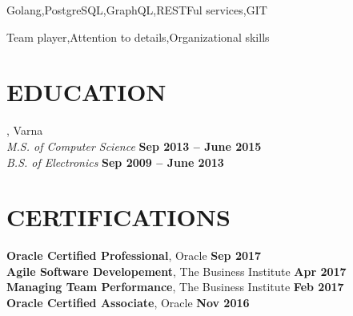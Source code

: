 \documentclass[margin,line]{resume}
\begin{document}
\begin{resume}
    \begin{list2}
      \item Golang,\hspace{2mm}PostgreSQL,\hspace{2mm}GraphQL,\hspace{2mm}RESTFul services,\hspace{2mm}GIT\@
      \item Team player,\hspace{2mm}Attention to details,\hspace{2mm}Organizational skills\@
    \end{list2}

\sectionline%

    \section{\mysidestyle\textbf{\large{E}\small{DUCATION}}}

    \textbf{}, Varna \vspace{2mm}\\\vspace{1mm}%
    \textsl{M.S. of Computer Science} \hfill \textbf{ Sep 2013 {--} June 2015}\\
    \textsl{B.S. of Electronics} \hfill \textbf{ Sep 2009 {--} June 2013}\\

\sectionline%

    \section{\mysidestyle\textbf{\large{C}\small{ERTIFICATIONS}}}

    \textbf{Oracle Certified Professional}, Oracle \hfill \textbf{Sep 2017} \vspace{2mm}\\\vspace{1mm}%
    \textbf{Agile Software Developement}, The Business Institute \hfill \textbf{Apr 2017} \vspace{2mm}\\\vspace{1mm}%
    \textbf{Managing Team Performance}, The Business Institute \hfill \textbf{Feb 2017} \vspace{2mm}\\\vspace{1mm}%
    \textbf{Oracle Certified Associate}, Oracle \hfill \textbf{Nov 2016} \vspace{2mm}\\\vspace{1mm}%

\end{resume}
\end{document}
